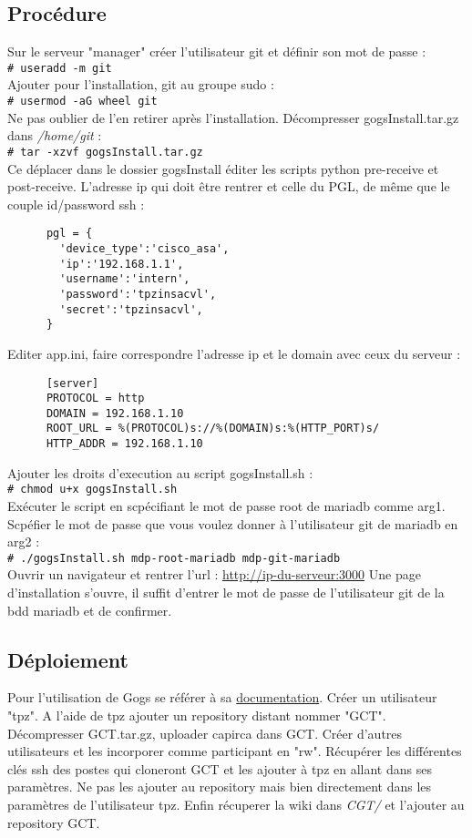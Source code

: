 \documentclass{article}
\newcommand{\shellcmd}[1]{\\\indent\indent\texttt{\footnotesize\# #1}\\}
\begin{document}
    \subsection{Procédure}

      Sur le serveur "manager" créer l'utilisateur git et définir son mot de passe : \shellcmd{useradd -m git}
      Ajouter pour l'installation, git au groupe sudo : \shellcmd{usermod -aG wheel git}
      Ne pas oublier de l'en retirer après l'installation. \smallbreak
      \noindent Décompresser gogsInstall.tar.gz dans \textit{/home/git} : \shellcmd{tar -xzvf gogsInstall.tar.gz}
      Ce déplacer dans le dossier gogsInstall éditer les scripts python pre-receive et post-receive.
      L'adresse ip qui doit être rentrer et celle du PGL, de même que le couple id/password ssh :
\begin{verbatim}
      pgl = {
        'device_type':'cisco_asa',
        'ip':'192.168.1.1',
        'username':'intern',
        'password':'tpzinsacvl',
        'secret':'tpzinsacvl',
      }
\end{verbatim}
      Editer app.ini, faire correspondre l'adresse ip et le domain avec ceux du serveur :
\begin{verbatim}
      [server]
      PROTOCOL = http
      DOMAIN = 192.168.1.10
      ROOT_URL = %(PROTOCOL)s://%(DOMAIN)s:%(HTTP_PORT)s/
      HTTP_ADDR = 192.168.1.10
\end{verbatim}
      Ajouter les droits d'execution au script gogsInstall.sh : \shellcmd{chmod u+x gogsInstall.sh}
      Exécuter le script en scpécifiant le mot de passe root de mariadb comme arg1. Scpéfier le mot de passe que vous voulez donner
      à l'utilisateur git de mariadb en arg2 : \shellcmd{./gogsInstall.sh mdp-root-mariadb mdp-git-mariadb}
      Ouvrir un navigateur et rentrer l'url : \url{http://ip-du-serveur:3000} \smallbreak
      \noindent Une page d'installation s'ouvre, il suffit d'entrer le mot de passe de l'utilisateur git de la bdd mariadb et de confirmer.

    \subsection{Déploiement}

      Pour l'utilisation de Gogs se référer à sa \href{https://gogs.io/docs}{documentation}. \bigbreak
      \noindent Créer un utilisateur "tpz". A l'aide de tpz ajouter un repository distant nommer "GCT".
      Décompresser GCT.tar.gz, uploader capirca dans GCT. Créer d'autres utilisateurs et les incorporer comme participant en "rw".
      Récupérer les différentes clés ssh des postes qui cloneront GCT et les ajouter à tpz en allant dans ses paramètres.
      Ne pas les ajouter au repository mais bien directement dans les paramètres de l'utilisateur tpz.
      Enfin récuperer la wiki dans \textit{CGT/} et l'ajouter au repository GCT.
\begin{comment}
\texttt{[image: capirca.png]}
\end{comment}
\end{document}
